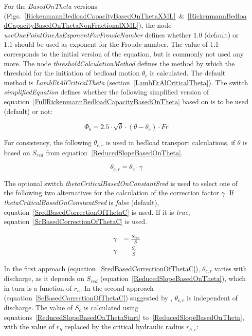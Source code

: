 \documentclass[11pt,a4paper]{article}
\begin{document}
For the \emph{BasedOnTheta} versions (Figs.~\ref{RickenmannBedloadCapacityBasedOnThetaXML}~\&{}~\ref{RickenmannBedloadCapacityBasedOnThetaNonFractionalXML}), the node \emph{useOnePointOneAsExponentForFroudeNumber} defines whether $1.0$ (default) or $1.1$ should be used as exponent for the Froude number. The value of $1.1$ corresponds to the initial version of the equation, but is commonly not used any more. The node \emph{thresholdCalculationMethod} defines the method by which the threshold for the initiation of bedload motion $\theta_c$ is calculated. The default method is \emph{LambEtAlCriticalTheta} (section~\ref{LambEtAlCriticalTheta}). The switch \emph{simplifiedEquation} defines whether the following simplified version of equation~\ref{FullRickenmannBedloadCapacityBasedOnTheta} based on \citet{Rickenmann2001} is to be used (default) or not:

\begin{equation}
\Phi_b = 2.5 \cdot \sqrt{\theta} \cdot \left( \theta - \theta_c \right) \cdot Fr
\end{equation}


For consistency, the following $\theta{}_{c,r}$ is used in bedload transport calculations, if $\theta$ is based on $S_{red}$ from equation~\ref{ReducedSlopeBasedOnTheta}.

\begin{equation}
\theta{}_{c,r} = \theta{}_{c} \cdot \gamma
\label{CorrectionOfThetaC}
\end{equation}

The optional switch \emph{thetaCriticalBasedOnConstantSred} is used to select one of the following two alternatives for the calculation of the correction factor $\gamma$. If \emph{thetaCriticalBasedOnConstantSred} is \emph{false} (default), equation~\ref{SredBasedCorrectionOfThetaC} is used. If it is \emph{true}, equation~\ref{ScBasedCorrectionOfThetaC} is used.

\begin{subequations}
\begin{align}
\gamma &= \frac{S_{red}}{S} \label{SredBasedCorrectionOfThetaC}\\
\gamma &= \frac{S_{c}}{S} \label{ScBasedCorrectionOfThetaC}
\end{align}
\end{subequations}

In the first approach (equation~\ref{SredBasedCorrectionOfThetaC}), $\theta{}_{c,r}$ varies with discharge, as it depends on $S_{red}$ (equation~\ref{ReducedSlopeBasedOnTheta}), which in turn is a function of $r_h$. In the second approach (equation~\ref{ScBasedCorrectionOfThetaC}) suggested by \citet{Nitsche++2011}, $\theta{}_{c,r}$ is independent of discharge. The value of $S_c$ is calculated using equations~\ref{ReducedSlopeBasedOnThetaStart} to~\ref{ReducedSlopeBasedOnTheta}, with the value of $r_h$ replaced by the critical hydraulic radius $r_{h,c}$:
\end{document}
